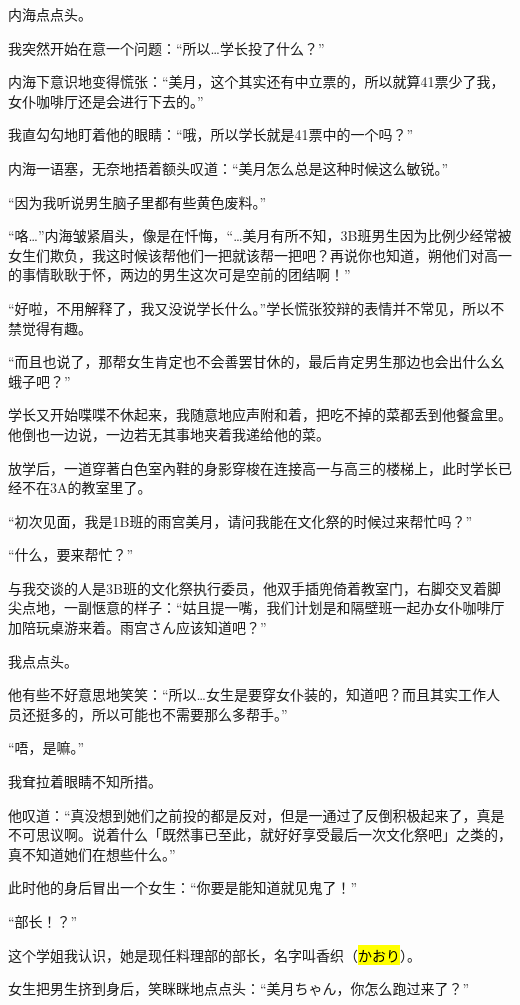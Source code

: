 内海点点头。

我突然开始在意一个问题：“所以…学长投了什么？”

内海下意识地变得慌张：“美月，这个其实还有中立票的，所以就算41票少了我，女仆咖啡厅还是会进行下去的。”

我直勾勾地盯着他的眼睛：“哦，所以学长就是41票中的一个吗？”

内海一语塞，无奈地捂着额头叹道：“美月怎么总是这种时候这么敏锐。”

“因为我听说男生脑子里都有些黄色废料。”

“咯…”内海皱紧眉头，像是在忏悔，“…美月有所不知，3B班男生因为比例少经常被女生们欺负，我这时候该帮他们一把就该帮一把吧？再说你也知道，朔他们对高一的事情耿耿于怀，两边的男生这次可是空前的团结啊！”

“好啦，不用解释了，我又没说学长什么。”学长慌张狡辩的表情并不常见，所以不禁觉得有趣。

“而且也说了，那帮女生肯定也不会善罢甘休的，最后肯定男生那边也会出什么幺蛾子吧？”

学长又开始喋喋不休起来，我随意地应声附和着，把吃不掉的菜都丢到他餐盒里。他倒也一边说，一边若无其事地夹着我递给他的菜。


\cutlinef\timepast

放学后，一道穿著白色室內鞋的身影穿梭在连接高一与高三的楼梯上，此时学长已经不在3A的教室里了。

“初次见面，我是1B班的雨宫美月，请问我能在文化祭的时候过来帮忙吗？”

“什么，要来帮忙？”

与我交谈的人是3B班的文化祭执行委员，他双手插兜倚着教室门，右脚交叉着脚尖点地，一副惬意的样子：“姑且提一嘴，我们计划是和隔壁班一起办女仆咖啡厅加陪玩桌游来着。雨宫さん应该知道吧？”

我点点头。

他有些不好意思地笑笑：“所以…女生是要穿女仆装的，知道吧？而且其实工作人员还挺多的，所以可能也不需要那么多帮手。”

“唔，是嘛。”

我耷拉着眼睛不知所措。

他叹道：“真没想到她们之前投的都是反对，但是一通过了反倒积极起来了，真是不可思议啊。说着什么「既然事已至此，就好好享受最后一次文化祭吧」之类的，真不知道她们在想些什么。”

此时他的身后冒出一个女生：“你要是能知道就见鬼了！”

“部长！？”

这个学姐我认识，她是现任料理部的部长，名字叫香织（\hl{かおり}）。

女生把男生挤到身后，笑眯眯地点点头：“美月ちゃん，你怎么跑过来了？”

